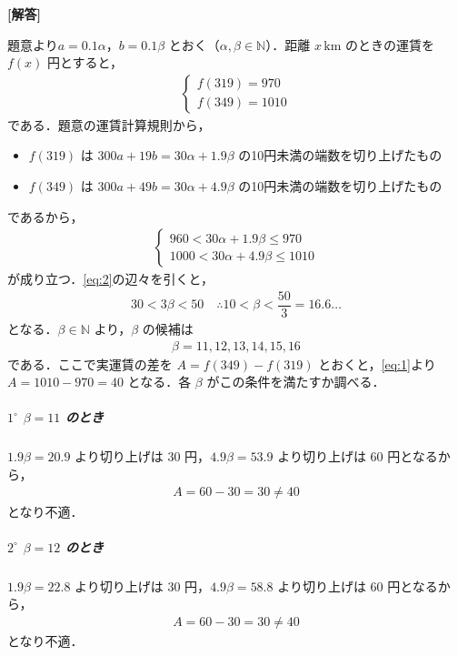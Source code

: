 \documentclass[../../main.tex]{subfiles}
\begin{document}
\begin{oframed}
  
\end{oframed}

{\bf [解答]}

題意より$a = 0.1\alpha$，$b = 0.1\beta$ とおく（$\alpha, \beta \in \mathbb{N}$）．距離 $x\,\mathrm{km}$ のときの運賃を $f(x)$ 円とすると，
\begin{align}
  \begin{cases}
    f(319) = 970 \\
    f(349) = 1010
  \end{cases} \label{eq:1}
\end{align}
である．題意の運賃計算規則から，
\begin{itemize}
  \item $f(319)$ は $300a + 19b = 30\alpha + 1.9\beta$ の10円未満の端数を切り上げたもの
  \item $f(349)$ は $300a + 49b = 30\alpha + 4.9\beta$ の10円未満の端数を切り上げたもの
\end{itemize}
であるから，
\begin{align}
  \begin{cases}
    960 < 30\alpha + 1.9\beta \le 970 \\
    1000 < 30\alpha + 4.9\beta \le 1010
  \end{cases} \label{eq:2}
\end{align}
が成り立つ．\cref{eq:2}の辺々を引くと，
\begin{align}
  30 < 3\beta < 50 \quad \therefore 10 < \beta < \dfrac{50}{3} = 16.6\dots
\end{align}
となる．$\beta \in \mathbb{N}$ より，$\beta$ の候補は
\begin{align}
  \beta = 11, 12, 13, 14, 15, 16
\end{align}
である．ここで実運賃の差を $A = f(349) - f(319)$ とおくと，\cref{eq:1}より $A = 1010 - 970 = 40$ となる．各 $\beta$ がこの条件を満たすか調べる．

\subparagraph{$1^\circ$ $\beta = 11$ のとき}
$1.9\beta = 20.9$ より切り上げは $30$ 円，$4.9\beta = 53.9$ より切り上げは $60$ 円となるから，
\begin{align}
  A = 60 - 30 = 30 \ne 40
\end{align}
となり不適．

\subparagraph{$2^\circ$ $\beta = 12$ のとき}

$1.9\beta = 22.8$ より切り上げは $30$ 円，$4.9\beta = 58.8$ より切り上げは $60$ 円となるから，
\begin{align}
  A = 60 - 30 = 30 \ne 40
\end{align}
となり不適．
\end{document}
